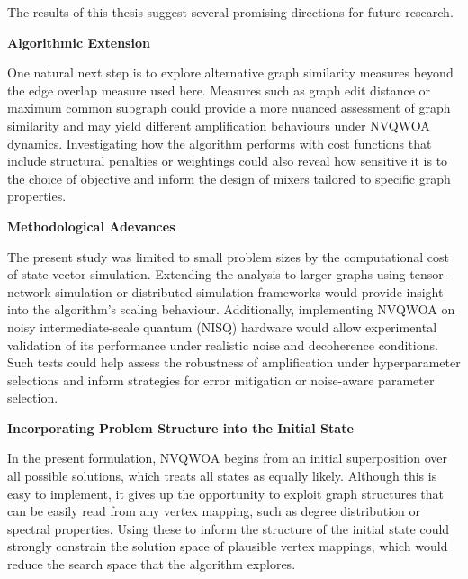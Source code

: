 The results of this thesis suggest several promising directions for future research.

\textbf{Algorithmic Extension}

One natural next step is to explore alternative graph similarity measures beyond the edge overlap measure used here. Measures such as graph edit distance or maximum common subgraph could provide a more nuanced assessment of graph similarity and may yield different amplification behaviours under NVQWOA dynamics. Investigating how the algorithm performs with cost functions that include structural penalties or weightings could also reveal how sensitive it is to the choice of objective and inform the design of mixers tailored to specific graph properties. 

\textbf{Methodological Adevances}

The present study was limited to small problem sizes by the computational cost of state-vector simulation. Extending the analysis to larger graphs using tensor-network simulation or distributed simulation frameworks would provide  insight into the algorithm's scaling behaviour. Additionally, implementing NVQWOA on noisy intermediate-scale quantum (NISQ) hardware would allow experimental validation of its performance under realistic noise and decoherence conditions. Such tests could help assess the robustness of amplification under hyperparameter selections and inform strategies for error mitigation or noise-aware parameter selection.

\textbf{Incorporating Problem Structure into the Initial State}

In the present formulation, NVQWOA begins from an initial superposition over all possible solutions, which treats all states as equally likely. Although this is easy to implement, it gives up the opportunity to exploit graph structures that can be easily read from any vertex mapping, such as degree distribution or spectral properties. Using these to inform the structure of the initial state could strongly constrain the solution space of plausible vertex mappings, which would reduce the search space that the algorithm explores.